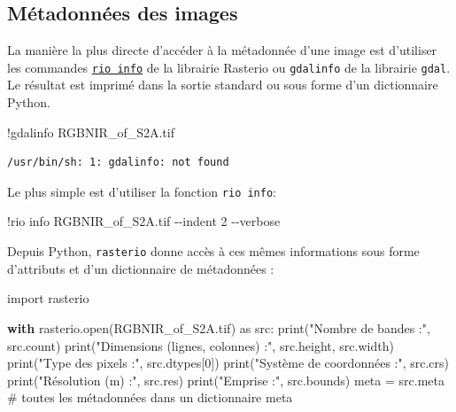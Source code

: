 \documentclass[
  french,
  11pt,
  letterpaper,
  open=any,
  twoside=false,
  french]{scrbook}
\newenvironment{Shaded}{\begin{snugshade}}{\end{snugshade}}
\newcommand{\BuiltInTok}[1]{\textcolor[rgb]{0.00,0.23,0.31}{#1}}
\newcommand{\CommentTok}[1]{\textcolor[rgb]{0.37,0.37,0.37}{#1}}
\newcommand{\ControlFlowTok}[1]{\textcolor[rgb]{0.00,0.23,0.31}{\textbf{#1}}}
\newcommand{\DecValTok}[1]{\textcolor[rgb]{0.68,0.00,0.00}{#1}}
\newcommand{\ImportTok}[1]{\textcolor[rgb]{0.00,0.46,0.62}{#1}}
\newcommand{\NormalTok}[1]{\textcolor[rgb]{0.00,0.23,0.31}{#1}}
\newcommand{\OperatorTok}[1]{\textcolor[rgb]{0.37,0.37,0.37}{#1}}
\newcommand{\StringTok}[1]{\textcolor[rgb]{0.13,0.47,0.30}{#1}}
\begin{document}
\subsection{Métadonnées des images}\label{muxe9tadonnuxe9es-des-images}

La manière la plus directe d'accéder à la métadonnée d'une image est
d'utiliser les commandes
\href{https://rasterio.readthedocs.io/en/stable/cli.html\#info}{\texttt{rio\ info}}
de la librairie Rasterio ou \texttt{gdalinfo} de la librairie
\texttt{gdal}. Le résultat est imprimé dans la sortie standard ou sous
forme d'un dictionnaire Python.

\begin{Shaded}
\begin{Highlighting}[]
\OperatorTok{!}\NormalTok{gdalinfo RGBNIR\_of\_S2A.tif}
\end{Highlighting}
\end{Shaded}

\begin{verbatim}
/usr/bin/sh: 1: gdalinfo: not found
\end{verbatim}

Le plus simple est d'utiliser la fonction \texttt{rio\ info}:

\begin{Shaded}
\begin{Highlighting}[]
\OperatorTok{!}\NormalTok{rio info RGBNIR\_of\_S2A.tif }\OperatorTok{{-}{-}}\NormalTok{indent }\DecValTok{2} \OperatorTok{{-}{-}}\NormalTok{verbose}
\end{Highlighting}
\end{Shaded}

Depuis Python, \texttt{rasterio} donne accès à ces mêmes informations
sous forme d'attributs et d'un dictionnaire de métadonnées :

\begin{Shaded}
\begin{Highlighting}[]
\ImportTok{import}\NormalTok{ rasterio}

\ControlFlowTok{with}\NormalTok{ rasterio.}\BuiltInTok{open}\NormalTok{(}\StringTok{\textquotesingle{}RGBNIR\_of\_S2A.tif\textquotesingle{}}\NormalTok{) }\ImportTok{as}\NormalTok{ src:}
    \BuiltInTok{print}\NormalTok{(}\StringTok{"Nombre de bandes :"}\NormalTok{, src.count)}
    \BuiltInTok{print}\NormalTok{(}\StringTok{"Dimensions (lignes, colonnes) :"}\NormalTok{, src.height, src.width)}
    \BuiltInTok{print}\NormalTok{(}\StringTok{"Type des pixels :"}\NormalTok{, src.dtypes[}\DecValTok{0}\NormalTok{])}
    \BuiltInTok{print}\NormalTok{(}\StringTok{"Système de coordonnées :"}\NormalTok{, src.crs)}
    \BuiltInTok{print}\NormalTok{(}\StringTok{"Résolution (m) :"}\NormalTok{, src.res)}
    \BuiltInTok{print}\NormalTok{(}\StringTok{"Emprise :"}\NormalTok{, src.bounds)}
\NormalTok{    meta }\OperatorTok{=}\NormalTok{ src.meta            }\CommentTok{\# toutes les métadonnées dans un dictionnaire}
\NormalTok{meta}
\end{Highlighting}
\end{Shaded}
\end{document}
